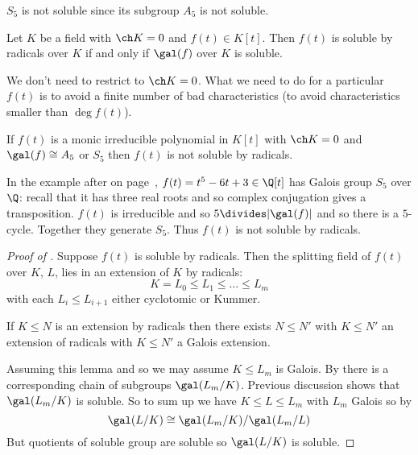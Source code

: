 \documentclass[a4paper]{article}
\begin{document}
\begin{eg}
  \(S_5\) is not soluble since its subgroup \(A_5\) is not soluble.
\end{eg}

\begin{theorem}
  \label{thm:solubility}
  Let \(K\) be a field with \(\ch K = 0\) and \(f(t) \in K[t]\). Then \(f(t)\) is soluble by radicals over \(K\) if and only if \(\gal(f)\) over \(K\) is soluble.
\end{theorem}

\begin{remark}
  We don't need to restrict to \(\ch K = 0\). What we need to do for a particular \(f(t)\) is to avoid a finite number of bad characteristics (to avoid characteristics smaller than \(\deg f(t)\)).
\end{remark}

\begin{corollary}
  If \(f(t)\) is a monic irreducible polynomial in \(K[t]\) with \(\ch K = 0\) and \(\gal(f) \cong A_5\) or \(S_5\) then \(f(t)\) is not soluble by radicals.
\end{corollary}

\begin{eg}
  In the example after  on page~\pageref{thm:galois group Sp}, \(f(t) = t^5 - 6t + 3 \in \Q[t]\) has Galois group \(S_5\) over \(\Q\): recall that it has three real roots and so complex conjugation gives a transposition. \(f(t)\) is irreducible and so \(5 \divides |\gal(f)|\) and so there is a \(5\)-cycle. Together they generate \(S_5\). Thus \(f(t)\) is not soluble by radicals.
\end{eg}

\begin{proof}[Proof of ]
  Suppose \(f(t)\) is soluble by radicals. Then the splitting field of \(f(t)\) over \(K\), \(L\), lies in an extension of \(K\) by radicals:
  \[
    K = L_0 \leq L_1 \leq \dots \leq L_m
  \]
  with each \(L_i \leq L_{i + 1}\) either cyclotomic or Kummer.

  \begin{lemma}
    If \(K \leq N\) is an extension by radicals then there exists \(N \leq N'\) with \(K \leq N'\) an extension of radicals with \(K \leq N'\) a Galois extension.
  \end{lemma}

  Assuming this lemma and so we may assume \(K \leq L_m\) is Galois. By  there is a corresponding chain of subgroups \(\gal(L_m/K)\). Previous discussion shows that \(\gal(L_m/K)\) is soluble. So to sum up we have \(K \leq L \leq L_m\) with \(L_m\) Galois so by 
  \[
    \gal(L/K) \cong \gal(L_m/K)/\gal(L_m/L)
  \]
  But quotients of soluble group are soluble so \(\gal(L/K)\) is soluble.
\end{proof}
\printindex
\end{document}
